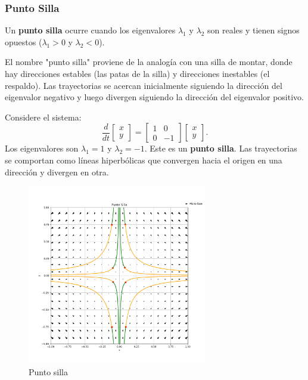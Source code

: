 \subsubsection{Punto Silla}

\begin{definition}
Un \textbf{punto silla} ocurre cuando los eigenvalores $\lambda_1$ y $\lambda_2$ son reales y tienen signos opuestos ($\lambda_1 > 0$ y $\lambda_2 < 0$).
\end{definition}

El nombre "punto silla" proviene de la analogía con una silla de montar, donde hay direcciones estables (las patas de la silla) y direcciones inestables (el respaldo). Las trayectorias se acercan inicialmente siguiendo la dirección del eigenvalor negativo y luego divergen siguiendo la dirección del eigenvalor positivo.

\begin{example}
Considere el sistema:
\[
\frac{d}{dt} \begin{bmatrix} x \\ y \end{bmatrix} = \begin{bmatrix} 1 & 0 \\ 0 & -1 \end{bmatrix} \begin{bmatrix} x \\ y \end{bmatrix}.
\]
Los eigenvalores son $\lambda_1 = 1$ y $\lambda_2 = -1$. Este es un \textbf{punto silla}. Las trayectorias se comportan como líneas hiperbólicas que convergen hacia el origen en una dirección y divergen en otra.
\end{example}

\begin{figure}[h]
    \centering
    \includegraphics[width=0.7\textwidth]{Img/PuntoSilla.png}
    \caption{Punto silla}
    \label{fig:punto_silla}
\end{figure}

